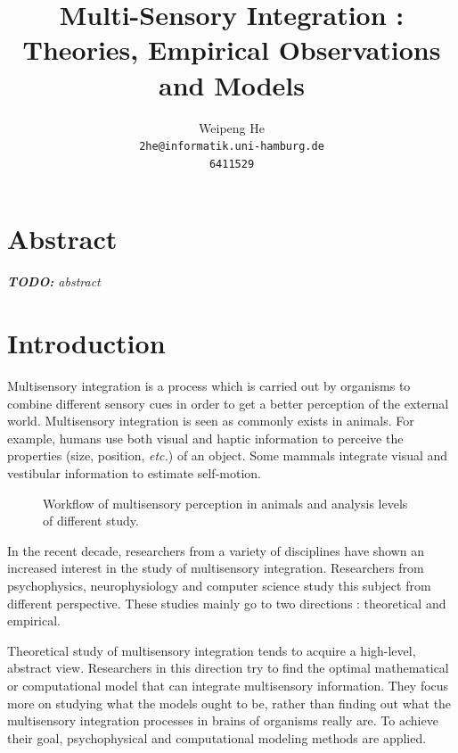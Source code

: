 \documentclass{article}[11pt]
\title{Multi-Sensory Integration : Theories, Empirical Observations and Models}
\author{Weipeng He \\ \texttt{2he@informatik.uni-hamburg.de} \\ \texttt{6411529}}
\newcommand{\inputTikZ}[1]{%
}
\newcommand{\TODO}[1]{\emph{\small{{\bf TODO: } #1}}}
\newcommand{\etc}{\textit{etc.}}
\begin{document}
\maketitle

\section*{Abstract}
\TODO{abstract}


\section{Introduction}
\label{sec:intro}

Multisensory integration is a process which is carried out by organisms to combine different sensory cues in order to get a better perception of the external world. 
Multisensory integration is seen as commonly exists in animals. For example, humans use both visual and haptic information to perceive the properties (size, position, \etc) of an object\cite{ernst_humans_2002}. Some mammals integrate visual and vestibular information to estimate self-motion\cite{fetsch_dynamic_2009}.

\begin{figure}[htpb]
  \centering \inputTikZ{flow}
  \caption{Workflow of multisensory perception in animals and analysis levels of different study.}
  \label{fig:general}
\end{figure}

In the recent decade, researchers from a variety of disciplines have shown an increased interest in the study of multisensory integration.
Researchers from psychophysics, neurophysiology and computer science study this subject from different perspective.
These studies mainly go to two directions : theoretical and empirical.

Theoretical study of multisensory integration tends to acquire a high-level, abstract view. Researchers in this direction try to find the optimal mathematical or computational model that can integrate multisensory information. They focus more on studying what the models ought to be, rather than finding out what the multisensory integration processes in brains of organisms really are.
To achieve their goal, psychophysical and computational modeling methods are applied.
\end{document}
